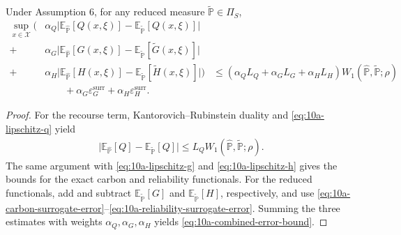 \begin{theorem}
Under Assumption 6, for any reduced measure \(\widetilde{\mathbb{P}}\in\Pi_S\),
\begin{align}
\sup_{x\in\mathcal{X}} \Bigg(
&\alpha_Q \big|\mathbb{E}_{\widehat{\mathbb{P}}}[Q(x,\xi)]-\mathbb{E}_{\widetilde{\mathbb{P}}}[Q(x,\xi)]\big| \\
+&\alpha_G \big|\mathbb{E}_{\widehat{\mathbb{P}}}[G(x,\xi)]-\mathbb{E}_{\widetilde{\mathbb{P}}}[\widetilde G(x,\xi)]\big| \\
+&\alpha_H \big|\mathbb{E}_{\widehat{\mathbb{P}}}[H(x,\xi)]-\mathbb{E}_{\widetilde{\mathbb{P}}}[\widetilde H(x,\xi)]\big|
\Bigg)
&\le (\alpha_Q L_Q + \alpha_G L_G + \alpha_H L_H)
W_1(\widehat{\mathbb{P}},\widetilde{\mathbb{P}};\rho) \\
&\qquad + \alpha_G \varepsilon_G^{\mathrm{surr}} + \alpha_H \varepsilon_H^{\mathrm{surr}}.
\label{eq:10a-combined-error-bound}
\end{align}
\end{theorem}

\begin{proof}
For the recourse term, Kantorovich--Rubinstein duality and \eqref{eq:10a-lipschitz-q} yield
\begin{align}
\big|\mathbb{E}_{\widehat{\mathbb{P}}}[Q]-\mathbb{E}_{\widetilde{\mathbb{P}}}[Q]\big|
\le L_Q W_1(\widehat{\mathbb{P}},\widetilde{\mathbb{P}};\rho).
\end{align}
The same argument with \eqref{eq:10a-lipschitz-g} and \eqref{eq:10a-lipschitz-h} gives the bounds for the exact carbon and reliability functionals. For the reduced functionals, add and subtract \(\mathbb{E}_{\widetilde{\mathbb{P}}}[G]\) and \(\mathbb{E}_{\widetilde{\mathbb{P}}}[H]\), respectively, and use \eqref{eq:10a-carbon-surrogate-error}--\eqref{eq:10a-reliability-surrogate-error}. Summing the three estimates with weights \(\alpha_Q,\alpha_G,\alpha_H\) yields \eqref{eq:10a-combined-error-bound}.
\end{proof}

